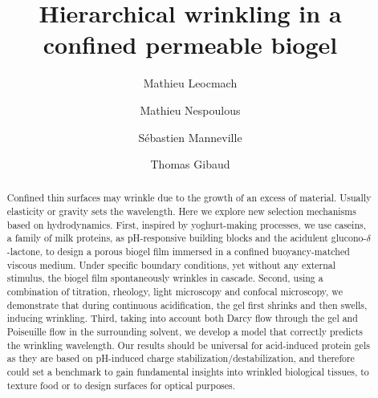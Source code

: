\documentclass[twocolumn,superscriptaddress,showpacs,preprintnumbers, amsmath,amssymb,prl]{revtex4-1}
\begin{document}
\title{Hierarchical wrinkling in a confined permeable biogel}
\author{Mathieu Leocmach}
\author{Mathieu Nespoulous}
\author{S\'ebastien Manneville}
\author{Thomas Gibaud}

\begin{abstract}
Confined thin surfaces may wrinkle due to the growth of an excess of material. Usually elasticity or gravity sets the wavelength. Here we explore new selection mechanisms based on hydrodynamics.
First, inspired by yoghurt-making processes, we use caseins, a family of milk proteins, as pH-responsive building blocks and the acidulent glucono-$\delta$-lactone, to design a porous biogel film immersed in a confined buoyancy-matched viscous medium.
Under specific boundary conditions, yet without any external stimulus, the biogel film spontaneously wrinkles in cascade.
Second, using a combination of titration, rheology, light microscopy and confocal microscopy, we demonstrate that during continuous acidification, the gel first shrinks and then swells, inducing wrinkling. 
Third, taking into account both Darcy flow through the gel and Poiseuille flow in the surrounding solvent, we develop a model that correctly predicts the wrinkling wavelength. Our results should be universal for acid-induced protein gels as they are based on pH-induced charge stabilization/destabilization, and therefore could set a benchmark to gain fundamental insights into wrinkled biological tissues, to texture food or to design surfaces for optical purposes.
\end{abstract}

\maketitle

\end{document}
